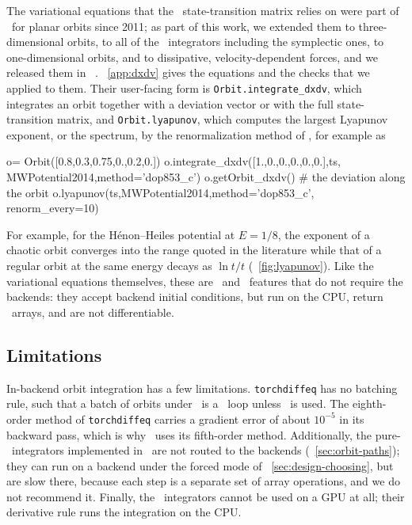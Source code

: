 The variational equations that the \cc\ state-transition matrix relies
on were part of \galpy\ for planar orbits since 2011; as part of this
work, we extended them to three-dimensional orbits, to all of the \cc\
integrators including the symplectic ones, to one-dimensional orbits,
and to dissipative, velocity-dependent forces, and we released them in
\galpy\ \flag{v1.12}. \appendixname~\ref{app:dxdv} gives the equations
and the checks that we applied to them. Their user-facing form is
\texttt{Orbit.integrate\_dxdv}, which integrates an orbit together with a
deviation vector or with the full state-transition matrix, and
\texttt{Orbit.lyapunov}, which computes the largest Lyapunov exponent, or
the spectrum, by the renormalization method of \citet{Benettin1980a,Benettin1980b},
for example as
\begin{code}
o= Orbit([0.8,0.3,0.75,0.,0.2,0.])
o.integrate_dxdv([1.,0.,0.,0.,0.,0.],ts,
                 MWPotential2014,method='dop853_c')
o.getOrbit_dxdv() # the deviation along the orbit
o.lyapunov(ts,MWPotential2014,method='dop853_c',
           renorm_every=10)
\end{code}
For
example, for the H\'enon--Heiles potential at $E=1/8$, the exponent of a chaotic orbit
converges into the range quoted in the literature while that of a
regular orbit at the same energy decays as $\ln t/t$
(\figurename~\ref{fig:lyapunov}). Like the variational equations
themselves, these are \numpy\ and \cc\ features that do not require
the backends: they accept backend initial conditions, but run on the
CPU, return \numpy\ arrays, and are not differentiable.

\subsection{Limitations}\label{sec:orbit-limitations}

In-backend orbit integration has a few limitations. 
\texttt{torchdiffeq}
has no batching rule, such that a batch of orbits under \torch\ is a
\python\ loop unless \torchode\ is used. The eighth-order method of
\texttt{torchdiffeq} carries a gradient error of about $10^{-5}$ in its
backward pass, which is why \galpy\ uses its fifth-order method. Additionally, the
pure-\python\ integrators implemented in \galpy\ are not routed to the
backends (\sectionname~\ref{sec:orbit-paths}); they can run on a
backend under the forced mode of \sectionname~\ref{sec:design-choosing},
but are slow there, because each step is a separate set of array
operations, and we do not recommend it.
Finally, the \cc\ integrators cannot be used on a GPU at
all; their derivative rule runs the integration on the CPU.

